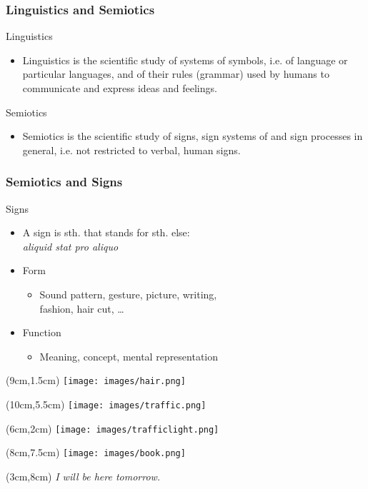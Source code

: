 \documentclass[12pt, table]{beamer}
\begin{document}
\begin{frame}
\frametitle{Linguistics and Semiotics}
Linguistics\\ 
\begin{itemize} 
\item Linguistics is the scientific study of systems of symbols, i.e. of language or particular languages, and of their rules (grammar) used by humans to communicate and express ideas and feelings.
\end{itemize}
Semiotics\\ 
\begin{itemize} 
\item Semiotics is the scientific study of signs, sign systems of and sign processes in general, i.e. not restricted to verbal, human signs.
\end{itemize}
\end{frame}

\begin{frame}
\frametitle{Semiotics and Signs}
Signs
\begin{itemize} 
\item A sign is sth. that stands for sth. else:\\
\textit{aliquid stat pro aliquo} 
\item Form
\begin{itemize} 
\item Sound pattern, gesture, picture, writing,\\fashion, hair cut, \dots
\end{itemize}
\item Function
\begin{itemize} 
\item Meaning, concept, mental representation
\end{itemize}
\end{itemize}
\begin{textblock*}{2cm}(9cm,1.5cm)
\texttt{[image: images/hair.png]}
\end{textblock*}
\begin{textblock*}{3cm}(10cm,5.5cm)
\texttt{[image: images/traffic.png]}
\end{textblock*}
\begin{textblock*}{6cm}(6cm,2cm)
\texttt{[image: images/trafficlight.png]}
\end{textblock*}
\begin{textblock*}{8cm}(8cm,7.5cm)
\texttt{[image: images/book.png]}
\end{textblock*}
\begin{textblock*}{6cm}(3cm,8cm)
\textit{I will be here tomorrow.}
\end{textblock*}
\end{frame}
\end{document}
